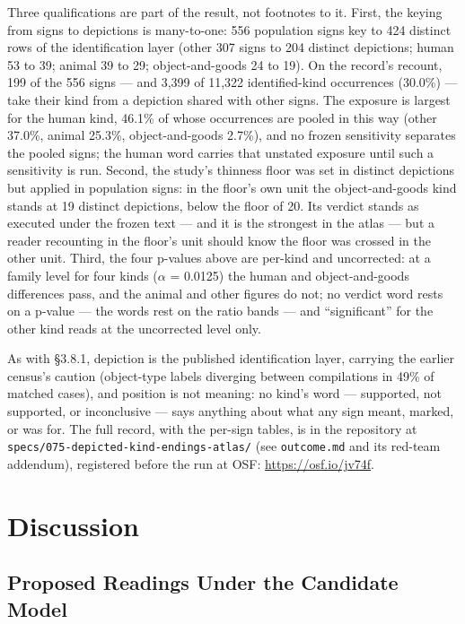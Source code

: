 \documentclass[11pt]{article}
\begin{document}
Three qualifications are part of the result, not footnotes to
it. First, the keying from signs to depictions is many-to-one: 556 population signs key to 424 distinct rows of the identification layer (other 307 signs to 204 distinct depictions; human 53 to 39; animal 39 to 29; object-and-goods 24 to 19). On the record's recount, 199 of the 556 signs --- and 3,399 of 11,322 identified-kind occurrences (30.0\%) --- take their kind from a depiction shared with other signs. The exposure is largest
for the human kind, 46.1\% of whose occurrences are pooled in
this way (other 37.0\%, animal 25.3\%, object-and-goods
2.7\%), and no frozen sensitivity separates the pooled signs;
the human word carries that unstated exposure until such a
sensitivity is run. Second, the study's thinness floor was set
in distinct depictions but applied in population signs: in the
floor's own unit the object-and-goods kind stands at 19
distinct depictions, below the floor of 20. Its verdict stands
as executed under the frozen text --- and it is the strongest
in the atlas --- but a reader recounting in the floor's unit
should know the floor was crossed in the other unit. Third,
the four p-values above are per-kind and uncorrected: at a
family level for four kinds ($\alpha$ = 0.0125) the human and
object-and-goods differences pass, and the animal and other
figures do not; no verdict word rests on a p-value --- the
words rest on the ratio bands --- and ``significant'' for the
other kind reads at the uncorrected level only.

As with §3.8.1, depiction is the published identification
layer, carrying the earlier census's caution (object-type
labels diverging between compilations in 49\% of matched
cases), and position is not meaning: no kind's word ---
supported, not supported, or inconclusive --- says anything
about what any sign meant, marked, or was for. The full
record, with the per-sign tables, is in the repository at
\texttt{specs/075-depicted-kind-endings-atlas/} (see
\texttt{outcome.md} and its red-team addendum), registered
before the run at OSF: \url{https://osf.io/jv74f}.


\section{Discussion}\label{discussion}

\subsection{Proposed Readings Under the Candidate Model}\label{proposed-readings-candidate-model}
\end{document}
